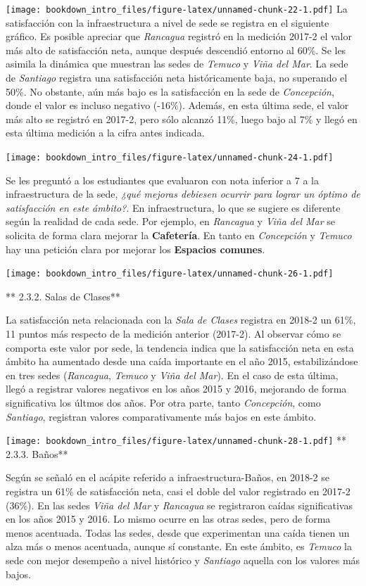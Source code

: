 \documentclass[]{book}
\begin{document}
\texttt{[image: bookdown\_intro\_files/figure-latex/unnamed-chunk-22-1.pdf]}
La satisfacción con la infraestructura a nivel de sede se registra en el
siguiente gráfico. Es posible apreciar que \emph{Rancagua} registró en
la medición 2017-2 el valor más alto de satisfacción neta, aunque
después descendió entorno al 60\%. Se les asimila la dinámica que
muestran las sedes de \emph{Temuco} y \emph{Viña del Mar}. La sede de
\emph{Santiago} registra una satisfacción neta históricamente baja, no
superando el 50\%. No obstante, aún más bajo es la satisfacción en la
sede de \emph{Concepción}, donde el valor es incluso negativo (-16\%).
Además, en esta última sede, el valor más alto se registró en 2017-2,
pero sólo alcanzó 11\%, luego bajo al 7\% y llegó en esta última
medición a la cifra antes indicada.

\texttt{[image: bookdown\_intro\_files/figure-latex/unnamed-chunk-24-1.pdf]}

Se les preguntó a los estudiantes que evaluaron con nota inferior a 7 a
la infraestructura de la sede, \emph{¿qué mejoras debiesen ocurrir para
lograr un óptimo de satisfacción en este ámbito?}. En infraestructura,
lo que se sugiere es diferente según la realidad de cada sede. Por
ejemplo, en \emph{Rancagua} y \emph{Viña del Mar} se solicita de forma
clara mejorar la \textbf{Cafetería}. En tanto en \emph{Concepción} y
\emph{Temuco} hay una petición clara por mejorar los \textbf{Espacios
comunes}.

\texttt{[image: bookdown\_intro\_files/figure-latex/unnamed-chunk-26-1.pdf]}

** 2.3.2. Salas de Clases**

La satisfacción neta relacionada con la \emph{Sala de Clases} registra
en 2018-2 un 61\%, 11 puntos más respecto de la medición anterior
(2017-2). Al observar cómo se comporta este valor por sede, la tendencia
indica que la satisfacción neta en esta ámbito ha aumentado desde una
caída importante en el año 2015, estabilizándose en tres sedes
(\emph{Rancagua}, \emph{Temuco} y \emph{Viña del Mar}). En el caso de
esta última, llegó a registrar valores negativos en los años 2015 y
2016, mejorando de forma significativa los últmos dos años. Por otra
parte, tanto \emph{Concepción}, como \emph{Santiago}, registran valores
comparativamente más bajos en este ámbito.

\texttt{[image: bookdown\_intro\_files/figure-latex/unnamed-chunk-28-1.pdf]}
** 2.3.3. Baños**

Según se señaló en el acápite referido a infraestructura-Baños, en
2018-2 se registra un 61\% de satisfacción neta, casi el doble del valor
registrado en 2017-2 (36\%). En las sedes \emph{Viña del Mar} y
\emph{Rancagua} se registraron caídas significativas en los años 2015 y
2016. Lo mismo ocurre en las otras sedes, pero de forma menos acentuada.
Todas las sedes, desde que experimentan una caída tienen un alza más o
menos acentuada, aunque sí constante. En este ámbito, es \emph{Temuco}
la sede con mejor desempeño a nivel histórico y \emph{Santiago} aquella
con los valores más bajos.
\end{document}
